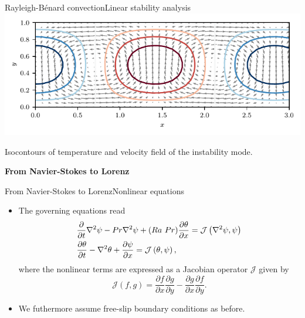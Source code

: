 \documentclass[usenames,dvipsnames,svgnames,10pt,aspectratio=169]{beamer}
\begin{document}
\begin{frame}[t, c]{Rayleigh-Bénard convection}{Linear stability analysis}
	\centering
	\includegraphics[width=.75\textwidth]{rayleigh_benard_instability_mode}

	Isocontours of temperature and velocity field of the instability mode.

	\vspace{1cm}
\end{frame}

\begin{frame}[t, c]{}
	\centering
	\vspace{1cm}

	{\Large \textbf{From Navier-Stokes to Lorenz}}

	\bigskip

	{}

\end{frame}

\begin{frame}[t, c]{From Navier-Stokes to Lorenz}{Nonlinear equations}
	\begin{itemize}
		\item The governing equations read
		\begin{equation}
			\begin{aligned}
				& \displaystyle \frac{\partial}{\partial t}\nabla^2 \psi - Pr \nabla^2 \psi + (Ra\ Pr)\frac{\partial \theta}{\partial x} = \mathcal{J} \left( \nabla^2 \psi, \psi \right) \\
				& \displaystyle \frac{\partial \theta}{\partial t} - \nabla^2 \theta + \frac{\partial \psi}{\partial x} = \mathcal{J}\left( \theta, \psi \right),
			\end{aligned}
			\notag
		\end{equation}
		where the nonlinear terms are expressed as a Jacobian operator $\mathcal{J}$ given by
		$$\mathcal{J}(f, g) = \displaystyle \frac{\partial f}{\partial x}\frac{\partial g}{\partial y} - \frac{\partial g}{\partial x}\frac{\partial f}{\partial y}.$$

		\item We futhermore assume free-slip boundary conditions as before.
	\end{itemize}

	\vspace{1cm}
\end{frame}
\end{document}
